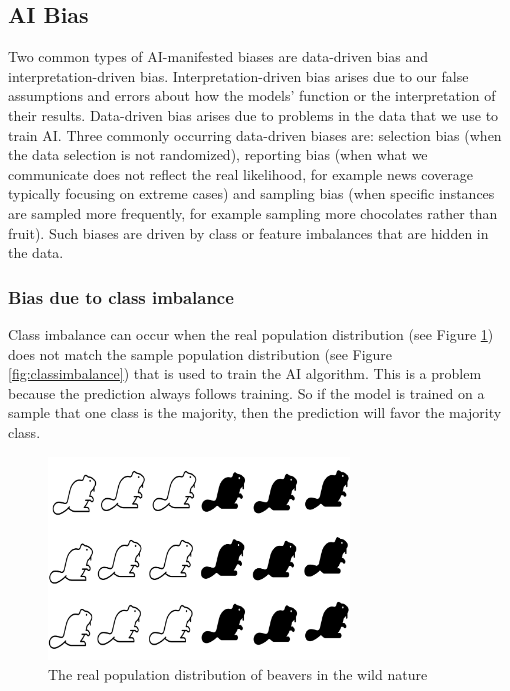 \documentclass[
]{book}
\begin{document}
\subsection{AI Bias}\label{ai-bias}

Two common types of AI-manifested biases are data-driven bias and interpretation-driven bias.
Interpretation-driven bias arises due to our false assumptions and errors about how the models' function or the interpretation of their results.
Data-driven bias arises due to problems in the data that we use to train AI. Three commonly occurring data-driven biases are: selection bias (when the data selection is not randomized), reporting bias (when what we communicate does not reflect the real likelihood, for example news coverage typically focusing on extreme cases) and sampling bias (when specific instances are sampled more frequently, for example sampling more chocolates rather than fruit). Such biases are driven by class or feature imbalances that are hidden in the data.

\subsubsection{Bias due to class imbalance}\label{bias-due-to-class-imbalance}

Class imbalance can occur when the real population distribution (see Figure \ref{fig:classdistribution}) does not match the sample population distribution (see Figure \ref{fig:classimbalance}) that is used to train the AI algorithm. This is a problem because the prediction always follows training. So if the model is trained on a sample that one class is the majority, then the prediction will favor the majority class.

\begin{figure}
\includegraphics[width=8cm]{./images/classdistribution} \caption{The real population distribution of beavers in the wild nature}\label{fig:classdistribution}
\end{figure}
\end{document}
